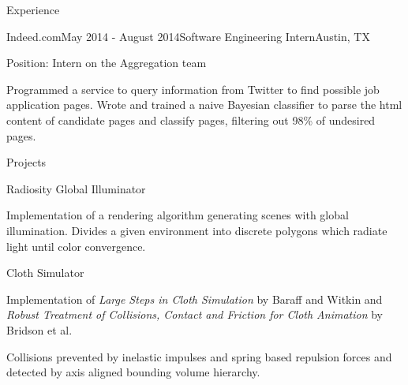 \documentclass{resume} %
\begin{document}
\begin{rSection}{Experience}

\begin{rSubsection}{Indeed.com}{May 2014 - August 2014}{Software Engineering Intern}{Austin, TX}
\item Position: Intern on the Aggregation team
\item Programmed a service to query information from Twitter to find possible job application pages. Wrote and trained a naive Bayesian classifier to parse the html content of candidate pages and classify pages, filtering out 98\% of undesired pages. 
\end{rSubsection}

\end{rSection}

\begin{rSection}{Projects}

  \begin{rSubsection}{Radiosity Global Illuminator}{}{}{}
  \item Implementation of a rendering algorithm generating scenes with global illumination. Divides a given environment into discrete polygons which radiate light until color convergence. 
  \end{rSubsection}

  \begin{rSubsection}{Cloth Simulator}{}{}{}
  \item Implementation of \textit{Large Steps in Cloth Simulation} by Baraff and Witkin and \textit{Robust Treatment of Collisions, Contact and Friction for Cloth Animation} by Bridson et al. 
  \item Collisions prevented by inelastic impulses and spring based repulsion forces and detected by axis aligned bounding volume hierarchy.
  \end{rSubsection}

\end{rSection}

\end{document}
